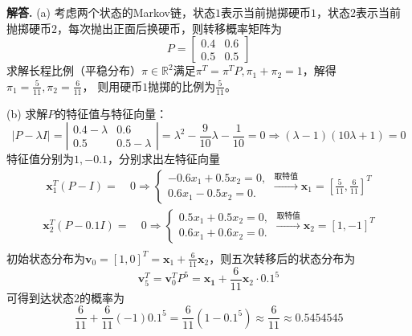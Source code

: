 \documentclass[12pt, a4paper, oneside]{ctexart}
\newenvironment{solution}[1][]{\par\noindent\textbf{#1解答. }}{\smallskip\par}  %
\def\bd{\boldsymbol}        %
\def\R{\mathbb{R}}          %
\begin{document}
\begin{solution}
    (a) 考虑两个状态的Markov链，状态$1$表示当前抛掷硬币$1$，状态$2$表示当前抛掷硬币$2$，每次抛出正面后换硬币，则转移概率矩阵为
    \begin{equation*}
        P=\begin{bmatrix}
            0.4&0.6\\
            0.5&0.5
        \end{bmatrix}
    \end{equation*}
    求解长程比例（平稳分布）$\pi\in\R^2$满足$\pi^T = \pi^T P, \pi_1+\pi_2 = 1$，解得$\pi_1=\frac{5}{11}, \pi_2=\frac{6}{11}$，
    则用硬币$1$抛掷的比例为$\frac{5}{11}$。

    (b) 求解$P$的特征值与特征向量：
    \begin{equation*}
        |P-\lambda I| = \left|\begin{matrix}
            0.4-\lambda&0.6\\
            0.5&0.5-\lambda
        \end{matrix}\right| = \lambda^2-\frac{9}{10}\lambda-\frac{1}{10} = 0
        \Rightarrow (\lambda-1)(10\lambda+1) = 0
    \end{equation*}
    特征值分别为$1, -0.1$，分别求出左特征向量
    \begin{align*}
        \bd{x}_1^T(P-I) =&\ 0 \Rightarrow \begin{cases}
            -0.6x_1+0.5x_2 = 0,\\
            0.6x_1-0.5x_2 = 0.
        \end{cases}\xrightarrow{\text{取特值}} \bd{x}_1=\left[\frac{5}{11},\frac{6}{11}\right]^T
    \end{align*}
    \begin{align*}
        \bd{x}_2^T(P-0.1I) =&\ 0 \Rightarrow \begin{cases}
            0.5x_1+0.5x_2 = 0,\\
            0.6x_1+0.6x_2 = 0.
        \end{cases}\xrightarrow{\text{取特值}} \bd{x}_2=\left[1,-1\right]^T\\
    \end{align*}
    初始状态分布为$\bd{v}_0 = [1,0]^T = \bd{x}_1+\frac{6}{11}\bd{x}_2$，则五次转移后的状态分布为
    \begin{equation*}
        \bd{v}_5^T = \bd{v}_0^TP^5 = \bd{x_1} + \frac{6}{11}\bd{x}_2\cdot0.1^5
    \end{equation*}
    可得到达状态$2$的概率为
    \begin{equation*}
        \frac{6}{11}+\frac{6}{11}(-1)0.1^5 = \frac{6}{11}(1-0.1^5)\approx \frac{6}{11}\approx 0.5454545
    \end{equation*}
\end{solution}
\end{document}
